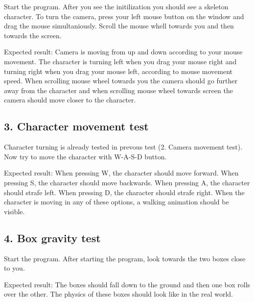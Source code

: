 \documentclass[11pt,twoside,a4paper]{article}
\begin{document}
Start the program. After you see the initilization you should see a skeleton character. To turn the camera, press your left mouse button on the window and drag the mouse simultaniously. Scroll the mouse whell towards you and then towards the screen.

Expected result: Camera is moving from up and down according to your mouse movement. The character is turning left when you drag your mouse right and turning right when you drag your mouse left, according to mouse movement speed. When scrolling mouse wheel towards you the camera should go further away from the character and when scrolling mouse wheel towards screen the camera should move closer to the character.

\subsection{3. Character movement test}

Character turning is already tested in prevous test (2. Camera movement test). Now try to move the character with W-A-S-D button.

Expected result: When pressing W, the character should move forward. When pressing S, the character should move backwards. When pressing A, the character should strafe left. When pressing D, the character should strafe right. When the character is moving in any of these options, a walking animation should be visible.

\subsection{4. Box gravity test}

Start the program. After starting the program, look towards the two boxes close to you.

Expected result: The boxes should fall down to the ground and then one box rolls over the other. The physics of these boxes should look like in the real world.
\end{document}
